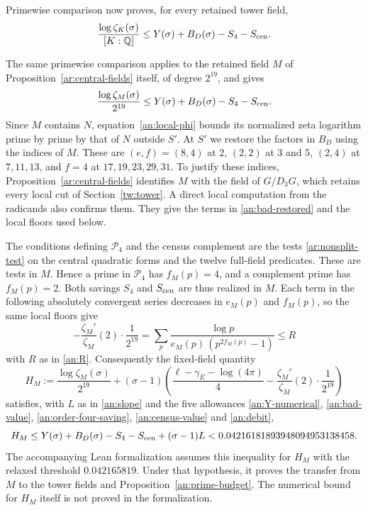 Primewise comparison now proves, for every retained tower field,
\begin{equation}\label{an:full-euler}
 \frac{\log\zeta_K(\sigma)}{[K:\mathbb Q]}
 \leq Y(\sigma)+B_D(\sigma)-S_4-S_{\rm cen}.
\end{equation}

\begin{remark}\label{an:fixed-field-form}
The same primewise comparison applies to the retained field $M$ of
Proposition~\ref{ar:central-fields} itself, of degree $2^{19}$, and
gives
\[
 \frac{\log\zeta_M(\sigma)}{2^{19}}
 \leq Y(\sigma)+B_D(\sigma)-S_4-S_{\rm cen}.
\]
Since $M$ contains $N$, equation~\eqref{an:local-phi} bounds its
normalized zeta logarithm prime by prime by that of $N$ outside $S'$.
At $S'$ we restore the factors in $B_D$ using the indices of $M$.
These are $(e,f)=(8,4)$ at $2$, $(2,2)$ at $3$ and $5$, $(2,4)$ at
$7,11,13$, and $f=4$ at $17,19,23,29,31$. To justify these indices,
Proposition~\ref{ar:central-fields} identifies $M$ with the field of
$G/D_3G$, which retains every local cut of Section~\ref{tw:tower}.
A direct local computation from the radicands also confirms them.
They give the terms in \eqref{an:bad-restored} and the local floors
used below.

The conditions defining $\mathcal P_4$ and the census complement are
the tests \eqref{ar:nonsplit-test} on the central quadratic forms and
the twelve full-field predicates. These are tests in $M$. Hence a prime
in $\mathcal P_4$ has $f_M(p)=4$, and a complement prime has $f_M(p)=2$.
Both savings $S_4$ and $S_{\rm cen}$ are thus realized in $M$.
Each term in the following absolutely convergent series decreases in
$e_M(p)$ and $f_M(p)$, so the same local floors give
\[
 -\frac{\zeta_M'}{\zeta_M}(2)\cdot\frac1{2^{19}}
 =\sum_p\frac{\log p}{e_M(p)\,(p^{2f_M(p)}-1)}\leq R
\]
with $R$ as in \eqref{an:R}.
Consequently the fixed-field quantity
\[
 H_M:=\frac{\log\zeta_M(\sigma)}{2^{19}}
 +(\sigma-1)\left(\frac{\ell-\gamma_E-\log(4\pi)}4
 -\frac{\zeta_M'}{\zeta_M}(2)\cdot\frac1{2^{19}}\right)
\]
satisfies, with $L$ as in \eqref{an:slope} and the five allowances
\eqref{an:Y-numerical}, \eqref{an:bad-value},
\eqref{an:order-four-saving}, \eqref{an:census-value} and
\eqref{an:debit},
\[
 H_M\leq Y(\sigma)+B_D(\sigma)-S_4-S_{\rm cen}+(\sigma-1)L
 <0.04216181893948094953138458.
\]
The accompanying Lean formalization assumes this inequality for $H_M$
with the relaxed threshold $0.042165819$. Under that hypothesis, it
proves the transfer from $M$ to the tower fields and
Proposition~\ref{an:prime-budget}. The numerical bound for $H_M$ itself
is not proved in the formalization.
\end{remark}

